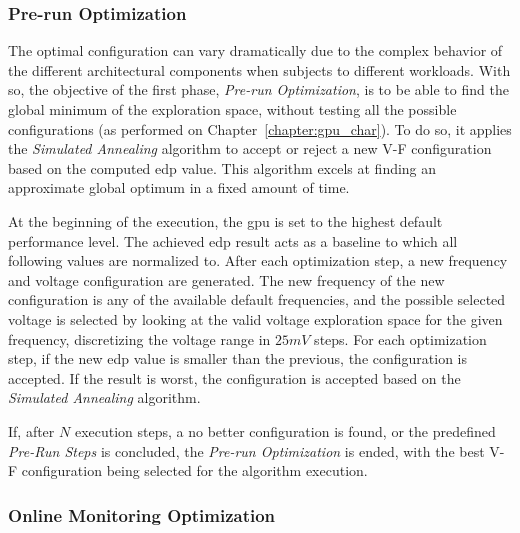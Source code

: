 \subsubsection{Pre-run Optimization}

The optimal configuration can vary dramatically due to the complex behavior of the different architectural components when subjects to different workloads. With so, the objective of the first phase, \textit{Pre-run Optimization}, is to be able to find the global minimum of the exploration space, without testing all the possible configurations (as performed on Chapter~\ref{chapter:gpu_char}). To do so, it applies the \textit{Simulated Annealing} algorithm to accept or reject a new V-F configuration based on the computed \acrshort{edp} value. This algorithm excels at finding an approximate global optimum in a fixed amount of time. 

At the beginning of the execution, the \acrshort{gpu} is set to the highest default performance level. The achieved \acrshort{edp} result acts as a baseline to which all following values are normalized to. After each optimization step, a new frequency and voltage configuration are generated.
The new frequency of the new configuration is any of the available default frequencies, and the possible selected voltage is selected by looking at the valid voltage exploration space for the given frequency, discretizing the voltage range in $25mV$ steps.
For each optimization step, if the new \acrshort{edp} value is smaller than the previous, the configuration is accepted. If the result is worst, the configuration is accepted based on the \textit{Simulated Annealing} algorithm.

If, after $ N $ execution steps, a no better configuration is found, or the predefined \textit{Pre-Run Steps} is concluded, the \textit{Pre-run Optimization} is ended, with the best V-F configuration being selected for the algorithm execution.

\subsubsection{Online Monitoring Optimization}

